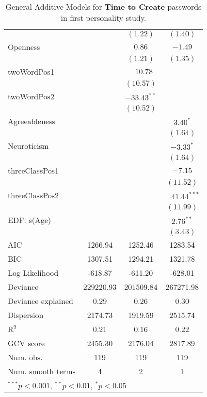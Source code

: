 \begin{table}
\begin{center}
\begin{tabular}{l c c c }
	&                & $(1.22)$      & $(1.40)$       \\
	Openness              &                & $0.86$        & $-1.49$        \\
	&                & $(1.21)$      & $(1.35)$       \\
	twoWordPos1           &                & $-10.78$      &                \\
	&                & $(10.57)$     &                \\
	twoWordPos2           &                & $-33.43^{**}$ &                \\
	&                & $(10.52)$     &                \\
	Agreeableness         &                &               & $3.40^{*}$     \\
	&                &               & $(1.64)$       \\
	Neuroticism           &                &               & $-3.33^{*}$    \\
	&                &               & $(1.64)$       \\
	threeClassPos1        &                &               & $-7.15$        \\
	&                &               & $(11.52)$      \\
	threeClassPos2        &                &               & $-41.44^{***}$ \\
	&                &               & $(11.99)$      \\
	EDF: s(Age)           &                &               & $2.76^{**}$    \\
	&                &               & $(3.43)$       \\
	\hline
	AIC                   & 1266.94        & 1252.46       & 1283.54        \\
	BIC                   & 1307.51        & 1294.21       & 1321.78        \\
	Log Likelihood        & -618.87        & -611.20       & -628.01        \\
	Deviance              & 229220.93      & 201509.84     & 267271.98      \\
	Deviance explained    & 0.29           & 0.26          & 0.30           \\
	Dispersion            & 2174.73        & 1919.59       & 2515.74        \\
	R$^2$                 & 0.21           & 0.16          & 0.22           \\
	GCV score             & 2455.30        & 2176.04       & 2817.89        \\
	Num. obs.             & 119            & 119           & 119            \\
	Num. smooth terms     & 4              & 2             & 1              \\
	\hline
	\multicolumn{4}{l}{\scriptsize{$^{***}p<0.001$, $^{**}p<0.01$, $^*p<0.05$}}
\end{tabular}
\caption{General Additive Models for \textbf{Time to Create} passwords in first personality study.}
\label{tab:personality:study-1:timing-models}
\end{center}
\end{table}
